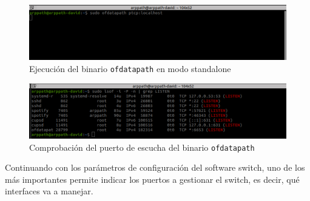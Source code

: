 \begin{figure}[ht!]
    \centering
    \includegraphics[width=\textwidth]{archivos/img/analisis/ofdata_1.png}
    \caption{Ejecución del binario \texttt{ofdatapath} en modo standalone}
    \label{fig:ofdata_1}
\end{figure}

\newpage

\begin{figure}[ht!]
    \centering
    \includegraphics[width=\textwidth]{archivos/img/analisis/ofdata_2.png}
    \caption{Comprobación del puerto de  escucha del binario \texttt{ofdatapath}}
    \label{fig:ofdata_2}
\end{figure}


Continuando con los parámetros de configuración del software switch, uno de los más importantes permite indicar los puertos a gestionar el switch, es decir, qué interfaces va a manejar.

